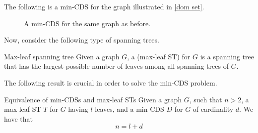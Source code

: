\documentclass[a4paper, 12pt]{report}
\begin{document}
    \begin{example}
        The following is a min-CDS for the graph illustrated in \cref{dom set}.

        \begin{figure}[H]
            \centering
            \caption{A min-CDS for the same graph as before.}
        \end{figure}
    \end{example}

    Now, consider the following type of spanning trees.

    \begin{frameddefn}{Max-leaf spanning tree}
        Given a graph $G$, a  (max-leaf ST) for $G$ is a spanning tree that has the largest possible number of leaves among all spanning trees of $G$.
    \end{frameddefn}

    The following result is crucial in order to solve the min-CDS problem.

    \begin{framedthm}{Equivalence of min-CDSs and max-leaf STs}
        Given a graph $G$, such that $n > 2$, a max-leaf ST $T$ for $G$ having $l$ leaves, and a min-CDS $D$ for $G$ of cardinality $d$. We have that $$n = l + d$$
    \end{framedthm}
\end{document}
